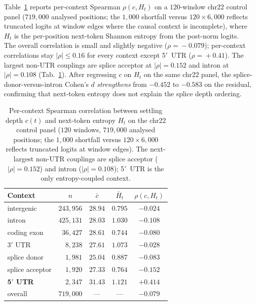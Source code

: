 \documentclass{article}
\theoremstyle{plain}
\theoremstyle{definition}
\theoremstyle{remark}
\begin{document}
Table~\ref{tab:entropy-decoup} reports per-context Spearman $\rho(c,
H_t)$ on a $120$-window chr22 control panel ($719{,}000$ analysed positions; the
  $1{,}000$ shortfall versus $120\!\times\!6{,}000$ reflects truncated logits at
window edges where the causal context is incomplete), where
$H_t$ is the per-position next-token Shannon entropy from the post-norm
logits. The overall correlation is small and slightly negative
($\rho\!=\!-0.079$); per-context correlations stay $|\rho|\!\leq\!0.16$
for every context except 5$'$~UTR ($\rho\!=\!+0.41$). The largest
non-UTR couplings are splice acceptor at $|\rho|\!=\!0.152$ and intron
at $|\rho|\!=\!0.108$ (Tab.~\ref{tab:entropy-decoup}). After regressing
$c$ on $H_t$ on the same chr22 panel, the splice-donor-versus-intron
Cohen's $d$ \emph{strengthens} from $-0.452$ to $-0.583$ on the
residual, confirming that next-token entropy does not explain the
splice depth ordering.

\begin{table}[!htbp]
  \caption{Per-context Spearman correlation between settling depth $c(t)$
    and next-token entropy $H_t$ on the chr22 control panel
    ($120$ windows, $719{,}000$ analysed positions; the $1{,}000$ shortfall versus
    $120\!\times\!6{,}000$ reflects truncated logits at window edges). The next-largest
    non-UTR couplings are splice acceptor ($|\rho|\!=\!0.152$) and intron
  ($|\rho|\!=\!0.108$); 5$'$~UTR is the only entropy-coupled context.}
  \label{tab:entropy-decoup}
  \centering
  \small
  \begin{tabular}{@{}lcccc@{}}
    \toprule
    Context & $n$ & $\bar c$ & $\bar H_t$ & $\rho(c, H_t)$ \\
    \midrule
    intergenic        & $243{,}956$ & $28.94$ & $0.795$ & $-0.024$ \\
    intron            & $425{,}131$ & $28.03$ & $1.030$ & $-0.108$ \\
    coding exon       & $\phantom{0}36{,}427$ & $28.61$ & $0.744$ & $-0.080$ \\
    3$'$ UTR          & $\phantom{00}8{,}238$ & $27.61$ & $1.073$ & $-0.028$ \\
    splice donor      & $\phantom{00}1{,}981$ & $25.04$ & $0.887$ & $-0.083$ \\
    splice acceptor   & $\phantom{00}1{,}920$ & $27.33$ & $0.764$ & $-0.152$ \\
    \textbf{5$'$ UTR} & $\phantom{00}2{,}347$ & $31.43$ & $1.121$ & $\mathbf{+0.414}$ \\
    \midrule
    overall           & $719{,}000$ & --- & --- & $-0.079$ \\
    \bottomrule
  \end{tabular}
\end{table}
\end{document}
